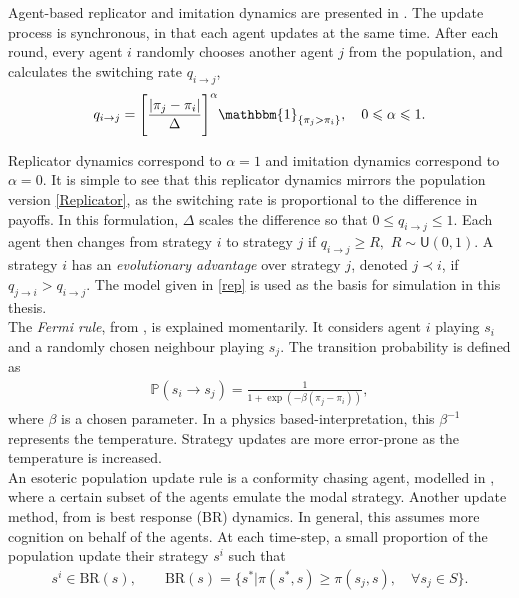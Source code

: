 Agent-based replicator and imitation dynamics are presented in \cite{RN30}. The update process is synchronous, in that each agent updates at the same time. After each round, every agent $i$ randomly chooses another agent $j$ from the population, and calculates the switching rate $q_{i\to j}$, \\

\begin{equation} \label{rep}
q_{i\to j} = \Bigg[ \frac{|\pi_j - \pi_i|}{\Delta} \Bigg]^\alpha \mathbbm{1}_{\{\pi_j>\pi_i\}}, \quad  0 \leq \alpha \leq 1.\end{equation} 

Replicator dynamics correspond to $\alpha = 1$ and imitation dynamics correspond to $\alpha = 0$. It is simple to see that this replicator dynamics mirrors the population version \eqref{Replicator}, as the switching rate is proportional to the difference in payoffs. In this formulation, $\Delta$ scales the difference so that $0 \leq q_{i\to j} \leq 1$. Each agent then changes from strategy $i$ to strategy $j$ if $q_{i\to j} \geq R,$ $R  \sim \mathsf{U}(0,1)$. A strategy $i$ has an \emph{evolutionary advantage} over strategy $j$, denoted $j \prec i$, if $q_{j \to i} >q_{i \to j}$. The model given in \eqref{rep} is used as the basis for simulation in this thesis.    \\


The \emph{Fermi rule}, from \cite{RN43}, is explained momentarily. It considers agent $i$ playing $s_i$ and a randomly chosen neighbour playing $s_j$. The transition probability is defined as 
\begin{align*}
    \mathbb P(s_i \to s_j) = \frac{1}{1+\exp(-\beta(\pi_j - \pi_i))},
\end{align*}
where $\beta$ is a chosen parameter. In a physics based-interpretation, this $\beta^{-1}$ represents the temperature. Strategy updates are more error-prone as the temperature is increased. \\

An esoteric population update rule is a conformity chasing agent, modelled in \cite{RN23}, where a certain subset of the agents emulate the modal strategy. Another update method, from \cite{RN81} is best response (BR) dynamics. In general, this assumes more cognition on behalf of the agents. At each time-step, a small proportion of the population update their strategy $s^i$ such that 
\begin{align*}
    s^i \in \textrm{BR}(s), \qquad \textrm{BR}(s) = \{s^*| \pi(s^*,s) \geq \pi(s_j,s), \quad \forall s_j \in S\}.
\end{align*}

